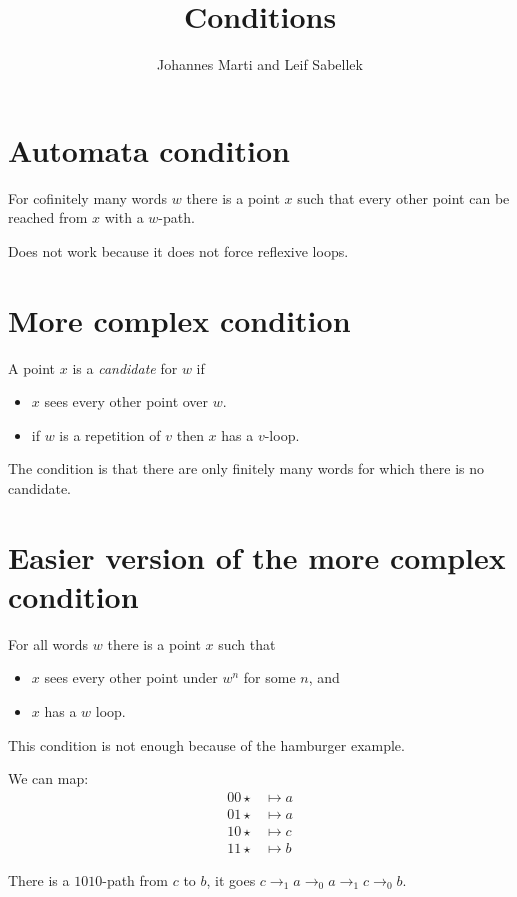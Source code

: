 \documentclass[a4paper]{article}
\title{Conditions}
\author{Johannes Marti and Leif Sabellek}
\begin{document}
\maketitle


\section{Automata condition}

For cofinitely many words $w$ there is a point $x$ such that every other
point can be reached from $x$ with a $w$-path.

Does not work because it does not force reflexive loops.


\section{More complex condition}

A point $x$ is a \emph{candidate} for $w$ if
\begin{itemize}
 \item $x$ sees every other point over $w$.
 \item if $w$ is a repetition of $v$ then $x$ has a $v$-loop.
\end{itemize}

The condition is that there are only finitely many words for which there
is no candidate.


\section{Easier version of the more complex condition}

For all words $w$ there is a point $x$ such that
\begin{itemize}
 \item $x$ sees every other point under $w^n$ for some $n$, and
 \item $x$ has a $w$ loop.
\end{itemize}

This condition is not enough because of the hamburger example.

We can map:
\[
\begin{array}{lll}
 00\star & \mapsto a \\
 01\star & \mapsto a \\
 10\star & \mapsto c \\
 11\star & \mapsto b
\end{array}
\]

There is a $1010$-path from $c$ to $b$, it goes $c \rightarrow_1 a
\rightarrow_0 a \rightarrow_1 c \rightarrow_0 b$.
\end{document}
